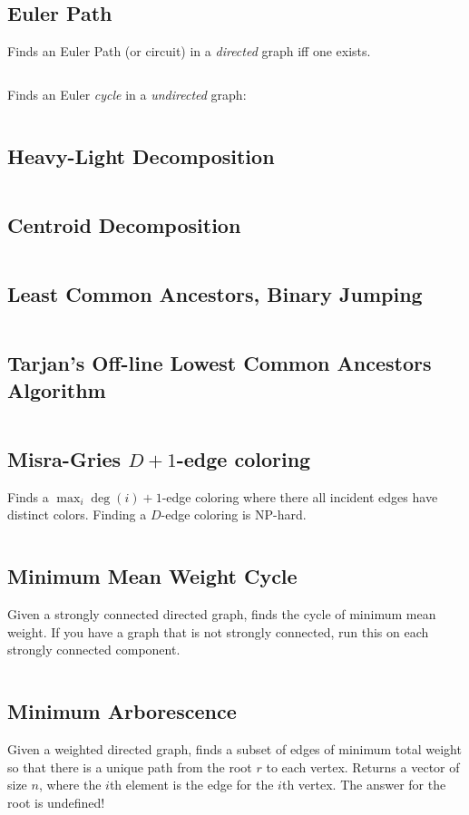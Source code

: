 \documentclass[8pt,a4paper,landscape,oneside]{amsart}
\newcommand{\mintedstyle}[2]{\inputminted[fontsize=\normalsize,baselinestretch=.9,breaklines,tabsize=2]{#1}{code/#2}}
\newcommand{\code}[1]{\mintedstyle{cpp}{#1}}
\begin{document}
\begin{multicols*}{3}
\subsection{Euler Path}
Finds an Euler Path (or circuit) in a \emph{directed} graph iff one exists.
\code{graphs/euler_path.cpp}
Finds an Euler \emph{cycle} in a \emph{undirected} graph:
\code{graphs/euler_path_undirected.cpp}

\subsection{Heavy-Light Decomposition}
\code{graphs/hld.cpp}

\subsection{Centroid Decomposition}
\code{graphs/centroid_decomposition.cpp}

\subsection{Least Common Ancestors, Binary Jumping}
\code{graphs/lca.cpp}

\subsection{Tarjan's Off-line Lowest Common Ancestors Algorithm}
\code{graphs/tarjan_olca.cpp}

\subsection{Misra-Gries $D+1$-edge coloring}
Finds a $\max_i \deg(i) + 1$-edge coloring where there all incident edges have distinct colors.
Finding a $D$-edge coloring is NP-hard.
\code{graphs/MisraGries.cpp}

\subsection{Minimum Mean Weight Cycle}
Given a strongly connected directed graph, finds the cycle of minimum
mean weight. If you have a graph that is not strongly connected, run
this on each strongly connected component.
\code{graphs/min_mean_cycle.cpp}

\subsection{Minimum Arborescence}
Given a weighted directed graph, finds a subset of edges of minimum
total weight so that there is a unique path from the root $r$ to each
vertex. Returns a vector of size $n$, where the $i$th element is the
edge for the $i$th vertex. The answer for the root is undefined!
\code{graphs/arborescence.cpp}


\end{multicols*}
\end{document}
